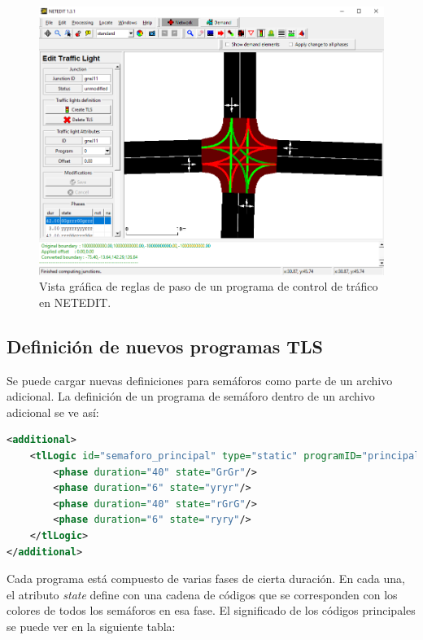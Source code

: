 \begin{figure}[h]
    \centering
\includegraphics[width=\textwidth]{sumo/e760085ba60c72e71c15ed1d0d5ab9aa.png}
    \caption{Vista gráfica de reglas de paso de un programa de control de
    tráfico en NETEDIT.}
    \label{fig:netedit3}
\end{figure}

\hypertarget{definiciuxf3n-de-nuevos-programas-tls}{%
\subsection{Definición de nuevos programas
TLS}\label{definiciuxf3n-de-nuevos-programas-tls}}

Se puede cargar nuevas definiciones para semáforos como parte de un
archivo adicional. La definición de un programa de semáforo dentro de un
archivo adicional se ve así:

\begin{lstlisting}[language=XML]
<additional>
    <tlLogic id="semaforo_principal" type="static" programID="principal" offset="0">
        <phase duration="40" state="GrGr"/>
        <phase duration="6" state="yryr"/>
        <phase duration="40" state="rGrG"/>
        <phase duration="6" state="ryry"/>
    </tlLogic>
</additional>
\end{lstlisting}

Cada programa está compuesto de varias fases de cierta duración. En cada
una, el atributo \emph{state} define con una cadena de códigos que se
corresponden con los colores de todos los semáforos en esa fase. El
significado de los códigos principales se puede ver en la siguiente
tabla:

